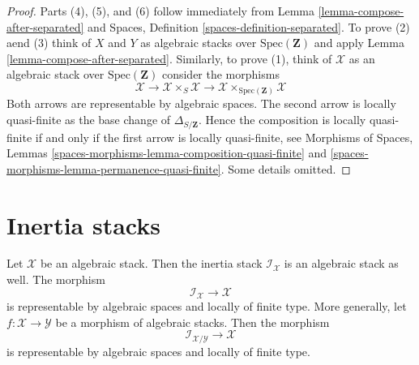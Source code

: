 \begin{proof}
Parts (4), (5), and (6) follow immediately from
Lemma \ref{lemma-compose-after-separated}
and
Spaces, Definition \ref{spaces-definition-separated}.
To prove (2) aend (3) think of $X$ and $Y$ as algebraic stacks over
$\text{Spec}(\mathbf{Z})$ and apply
Lemma \ref{lemma-compose-after-separated}.
Similarly, to prove (1), think of $\mathcal{X}$ as an algebraic
stack over $\text{Spec}(\mathbf{Z})$ consider the
morphisms
$$
\mathcal{X} \longrightarrow
\mathcal{X} \times_S \mathcal{X} \longrightarrow
\mathcal{X} \times_{\text{Spec}(\mathbf{Z})} \mathcal{X}
$$
Both arrows are representable by algebraic spaces.
The second arrow is locally quasi-finite as the base change of
$\Delta_{S/\mathbf{Z}}$. Hence the composition is locally
quasi-finite if and only if the first arrow is locally quasi-finite, see
Morphisms of Spaces,
Lemmas \ref{spaces-morphisms-lemma-composition-quasi-finite} and
\ref{spaces-morphisms-lemma-permanence-quasi-finite}.
Some details omitted.
\end{proof}

















\section{Inertia stacks}
\label{section-inertia}

\begin{lemma}
\label{lemma-inertia}
Let $\mathcal{X}$ be an algebraic stack. Then the inertia stack
$\mathcal{I}_{\mathcal{X}}$ is an algebraic stack as well.
The morphism
$$
\mathcal{I}_{\mathcal{X}} \longrightarrow \mathcal{X}
$$
is representable by algebraic spaces and locally of finite type.
More generally, let $f : \mathcal{X} \to \mathcal{Y}$ be a morphism
of algebraic stacks. Then the morphism
$$
\mathcal{I}_{\mathcal{X}/\mathcal{Y}} \longrightarrow \mathcal{X}
$$
is representable by algebraic spaces and locally of finite type.
\end{lemma}


